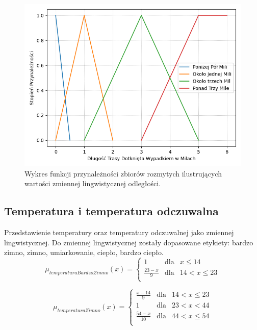 \documentclass{classrep}
\begin{document}
\begin{figure}[h!]
\centering
\includegraphics[width=14cm]{FunkcjaPrzynaleznosciOdleglosc.png}
\vspace{-0.3cm}
\caption{Wykres funkcji przynależności zbiorów rozmytych ilustrujących wartości zmiennej lingwistycznej odległości. }
\label{rysunek do eksperymentu 1 wariantu 1}
\end{figure}
\newpage

\subsection{Temperatura i temperatura odczuwalna}
Przedstawienie temperatury oraz temperatury odczuwalnej jako zmiennej lingwistycznej. Do zmiennej lingwistycznej zostały dopasowane etykiety: bardzo zimno, zimno, umiarkowanie, ciepło, bardzo ciepło.
\begin{equation}
\mu _{temperaturaBardzoZimno}(x) = \left\{ \begin{array}{rcl}
1 & \mbox{dla} & x \leq 14 \\
\frac{23 - x}{9} & \mbox{dla} & 14 < x \leq 23\\
\end{array}\right.
\end{equation}

\begin{equation}
\mu _{temperaturaZimno}(x) = \left\{ \begin{array}{rcl}
\frac{x - 14}{9} & \mbox{dla} & 14 < x \leq 23\\
1 & \mbox{dla} & 23 < x < 44\\
\frac{54 - x}{10} & \mbox{dla} & 44 < x \leq 54\\
\end{array}\right.
\end{equation}
\end{document}
